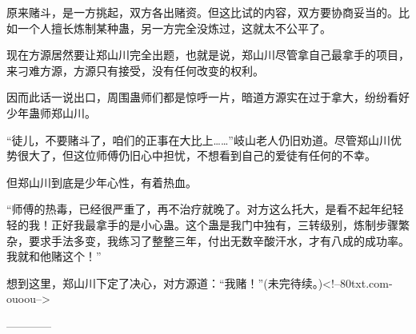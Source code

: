 \begin{this_body}
原来赌斗，是一方挑起，双方各出赌资。但这比试的内容，双方要协商妥当的。比如一个人擅长炼制某种蛊，另一方完全没炼过，这就太不公平了。

现在方源居然要让郑山川完全出题，也就是说，郑山川尽管拿自己最拿手的项目，来刁难方源，方源只有接受，没有任何改变的权利。

因而此话一说出口，周围蛊师们都是惊呼一片，暗道方源实在过于拿大，纷纷看好少年蛊师郑山川。

“徒儿，不要赌斗了，咱们的正事在大比上……”岐山老人仍旧劝道。尽管郑山川优势很大了，但这位师傅仍旧心中担忧，不想看到自己的爱徒有任何的不幸。

但郑山川到底是少年心性，有着热血。

“师傅的热毒，已经很严重了，再不治疗就晚了。对方这么托大，是看不起年纪轻轻的我！正好我最拿手的是小心蛊。这个蛊是我门中独有，三转级别，炼制步骤繁杂，要求手法多变，我练习了整整三年，付出无数辛酸汗水，才有八成的成功率。我就和他赌这个！”

想到这里，郑山川下定了决心，对方源道：“我赌！”(未完待续。)<!--80txt.com-ouoou-->

------------

\end{this_body}


